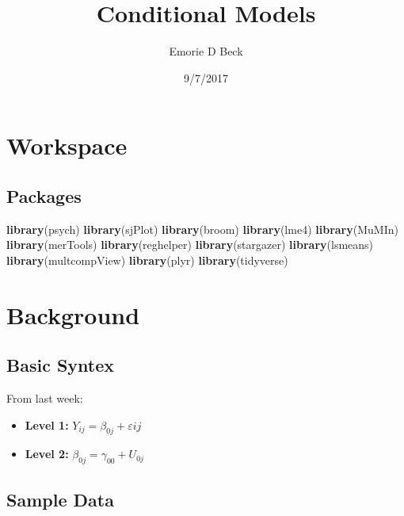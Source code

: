 \documentclass[]{article}
\title{Conditional Models}
\author{Emorie D Beck}
\date{9/7/2017}
\newenvironment{Shaded}{\begin{snugshade}}{\end{snugshade}}
\newcommand{\KeywordTok}[1]{\textcolor[rgb]{0.13,0.29,0.53}{\textbf{#1}}}
\newcommand{\NormalTok}[1]{#1}
\begin{document}
\maketitle

{
\setcounter{tocdepth}{2}
\tableofcontents
}
\section{Workspace}\label{workspace}

\subsection{Packages}\label{packages}

\begin{Shaded}
\begin{Highlighting}[]
\KeywordTok{library}\NormalTok{(psych)}
\KeywordTok{library}\NormalTok{(sjPlot)}
\KeywordTok{library}\NormalTok{(broom)}
\KeywordTok{library}\NormalTok{(lme4)}
\KeywordTok{library}\NormalTok{(MuMIn)}
\KeywordTok{library}\NormalTok{(merTools)}
\KeywordTok{library}\NormalTok{(reghelper)}
\KeywordTok{library}\NormalTok{(stargazer)}
\KeywordTok{library}\NormalTok{(lsmeans)}
\KeywordTok{library}\NormalTok{(multcompView)}
\KeywordTok{library}\NormalTok{(plyr)}
\KeywordTok{library}\NormalTok{(tidyverse)}
\end{Highlighting}
\end{Shaded}

\section{Background}\label{background}

\subsection{Basic Syntex}\label{basic-syntex}

From last week:

\begin{itemize}
  \item \textbf{Level 1:} $Y_{ij} = \beta_{0j} + \varepsilon{ij}$
  \item \textbf{Level 2:} $\beta_{0j} = \gamma_{00} + U_{0j}$
\end{itemize}

\subsection{Sample Data}\label{sample-data}
\end{document}
